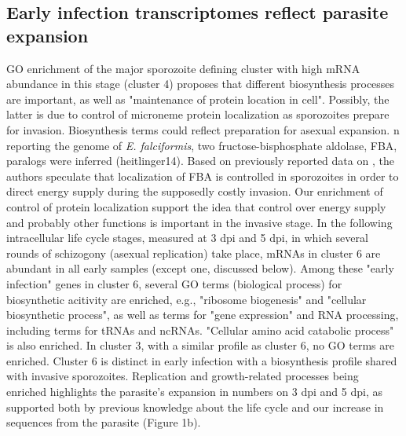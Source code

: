 \documentclass{bmcart}
\begin{document}
\subsection*{Early infection transcriptomes reflect parasite expansion}
GO enrichment of the major sporozoite defining cluster with high mRNA abundance in this stage (cluster 4) proposes that different biosynthesis processes are important, as well as "maintenance of protein location in cell". Possibly, the latter is due to control of microneme protein localization as sporozoites prepare for invasion. Biosynthesis terms could reflect preparation for asexual expansion. n reporting the genome of \textit{E. falciformis}, two fructose-bisphosphate aldolase, FBA, paralogs were inferred (heitlinger14). Based on previously reported data on , the authors speculate that localization of FBA is controlled in sporozoites in order to direct energy supply during the supposedly costly invasion. %
Our enrichment of control of protein localization support the idea that control over energy supply and probably other functions is important in the invasive stage.
In the following intracellular life cycle stages, measured at 3 dpi and 5 dpi, in which several rounds of schizogony (asexual replication) take place, mRNAs in cluster 6 are abundant in all early samples (except one, discussed below). Among these "early infection" genes in cluster 6, several GO terms (biological process) for biosynthetic acitivity are enriched, e.g., "ribosome biogenesis" and "cellular biosynthetic process", as well as terms for "gene expression" and RNA processing, including terms for tRNAs and ncRNAs. "Cellular amino acid catabolic process" is also enriched. In cluster 3, with a similar profile as cluster 6, no GO terms are enriched. Cluster 6 is distinct in early infection with a biosynthesis profile shared with invasive sporozoites. Replication and growth-related processes being enriched highlights the parasite's expansion in numbers on 3 dpi and 5 dpi, as supported both by previous knowledge about the life cycle and our increase in sequences from the parasite (Figure 1b). 
\end{document}

